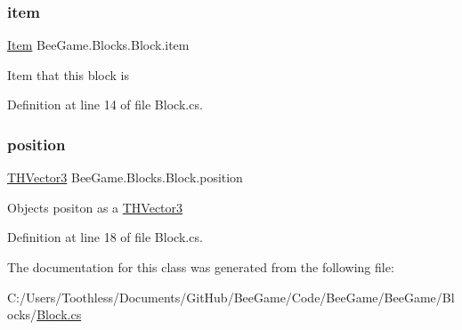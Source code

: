 \subsubsection{\texorpdfstring{item}{item}}
{\footnotesize\ttfamily \hyperlink{struct_bee_game_1_1_items_1_1_item}{Item} Bee\+Game.\+Blocks.\+Block.\+item}



Item that this block is 



Definition at line 14 of file Block.\+cs.

\mbox{\label{class_bee_game_1_1_blocks_1_1_block_a4bdeec76cfc1291eab6cebcd569620e6}} 
\subsubsection{\texorpdfstring{position}{position}}
{\footnotesize\ttfamily \hyperlink{struct_bee_game_1_1_t_h_vector3}{T\+H\+Vector3} Bee\+Game.\+Blocks.\+Block.\+position}



Objects positon as a \hyperlink{struct_bee_game_1_1_t_h_vector3}{T\+H\+Vector3} 



Definition at line 18 of file Block.\+cs.



The documentation for this class was generated from the following file\+:\begin{DoxyCompactItemize}
\item 
C\+:/\+Users/\+Toothless/\+Documents/\+Git\+Hub/\+Bee\+Game/\+Code/\+Bee\+Game/\+Bee\+Game/\+Blocks/\hyperlink{_block_8cs}{Block.\+cs}\end{DoxyCompactItemize}
